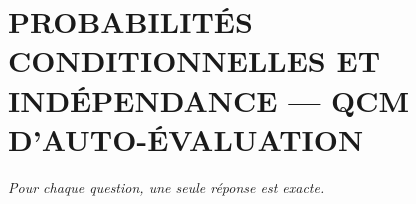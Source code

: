 
\section*{\textcolor{chapcolor}{\MakeUppercase{Probabilités conditionnelles et indépendance --- QCM d'auto-évaluation}}}

\begin{center}
\textit{Pour chaque question, une seule réponse est exacte.}
\end{center}

